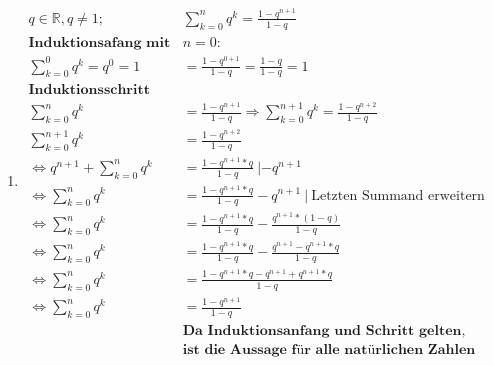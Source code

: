 \documentclass{article}
\begin{document}
\begin{enumerate}[label = (\alph*)]
            \item
                \begin{align*}
                    q \in \mathbb{R}, q \neq 1; \: & \sum_{k=0}^{n} q^k = \frac{1-q^{n+1}}{1-q} \\
                    \textbf{Induktionsafang mit } & n=0: \\
                    \sum_{k=0}^{0} q^k = q^0 = 1 & = \frac{1-q^{0+1}}{1-q} = \frac{1-q}{1-q} = 1 \\
                    \textbf{Induktionsschritt} & \\
                    \sum_{k=0}^{n} q^k & = \frac{1-q^{n+1}}{1-q} \Rightarrow \sum_{k=0}^{n+1} q^k = \frac{1-q^{n+2}}{1-q} \\
                    \sum_{k=0}^{n+1} q^k &= \frac{1-q^{n+2}}{1-q} \\
                    \Leftrightarrow q^{n+1} + \sum_{k=0}^{n} q^k &= \frac{1-q^{n+1} * q}{1-q} \: | - q^{n+1} \\
                    \Leftrightarrow \sum_{k=0}^{n} q^k &= \frac{1-q^{n+1} * q}{1-q} - q^{n+1} \: | \: \text{Letzten Summand erweitern}\\
                    \Leftrightarrow \sum_{k=0}^{n} q^k &= \frac{1-q^{n+1} * q}{1-q} - \frac{q^{n+1}*(1-q)}{1-q} \\
                    \Leftrightarrow \sum_{k=0}^{n} q^k &= \frac{1-q^{n+1} * q}{1-q} - \frac{q^{n+1}- q^{n+1} * q}{1-q} \\
                    \Leftrightarrow \sum_{k=0}^{n} q^k &= \frac{1-q^{n+1} * q - q^{n+1} + q^{n+1} * q}{1-q} \\
                    \Leftrightarrow \sum_{k=0}^{n} q^k &= \frac{1 - q^{n+1}}{1-q} \\
                    &\textbf{Da Induktionsanfang und Schritt gelten,} \\
                    &\textbf{ist die Aussage für alle natürlichen Zahlen gültig}
                \end{align*}
                

\end{enumerate}
\end{document}
